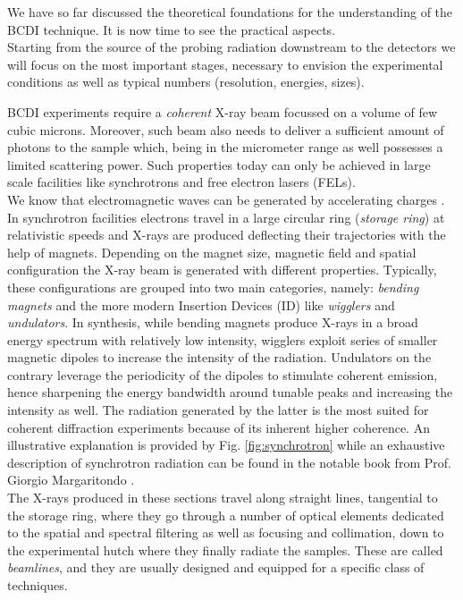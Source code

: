We have so far discussed the theoretical foundations for the understanding of the BCDI technique. It is now time to 
see the practical aspects. \\
Starting from the source of the probing radiation downstream to the detectors we will focus on the most important stages, 
necessary to envision the experimental conditions as well as typical numbers (resolution, energies, sizes).

BCDI experiments require a \textit{coherent} X-ray beam focussed on a volume of few cubic microns. Moreover, such beam also needs 
to deliver a sufficient amount of photons to the sample which, being in the micrometer range as well possesses a limited scattering 
power. Such properties today can only be achieved in large scale facilities like synchrotrons and free electron lasers (FELs). \\
We know that electromagnetic waves can be generated by accelerating charges \cite{griffiths}. In synchrotron facilities 
electrons travel in a large circular ring (\textit{storage ring}) at relativistic speeds and X-rays are produced deflecting their trajectories 
with the help of magnets. Depending on the magnet size, magnetic field and spatial configuration the X-ray beam is generated 
with different properties. Typically, these configurations are grouped into two main categories, namely: \textit{bending magnets} 
and the more modern Insertion Devices (ID) like \textit{wigglers} and \textit{undulators}. In synthesis, while bending magnets 
produce X-rays in a broad energy spectrum with relatively low intensity, wigglers exploit series of smaller magnetic dipoles 
to increase the intensity of the radiation. Undulators on the contrary leverage the periodicity of the dipoles to stimulate 
coherent emission, hence sharpening the energy bandwidth around tunable peaks and increasing the intensity as well. 
The radiation generated by the latter is the most suited for coherent diffraction experiments because of its inherent 
higher coherence.
An illustrative explanation is provided by Fig. \ref{fig:synchrotron} while an exhaustive description of synchrotron radiation can be found 
in the notable book from Prof. Giorgio Margaritondo \cite{margaritondo}.\\
The X-rays produced in these sections travel along straight lines, tangential to the storage ring, where they go through 
a number of optical elements dedicated to the spatial and spectral filtering as well as focusing and collimation, down 
to the experimental hutch where they finally radiate the samples. These are called \textit{beamlines}, and they are usually 
designed and equipped for a specific class of techniques. 

